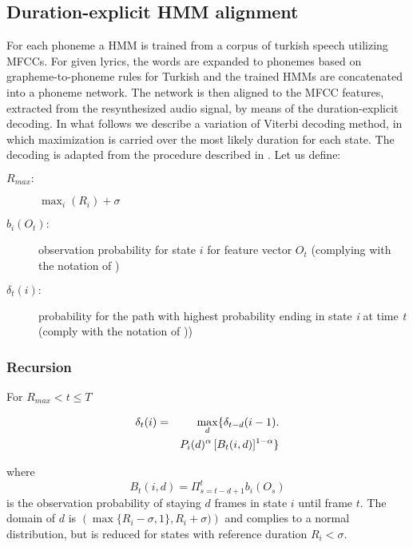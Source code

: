 \documentclass{article}
\begin{document}
\subsection{Duration-explicit HMM alignment}

For each phoneme a HMM is trained from a corpus of turkish speech
utilizing MFCCs. For given lyrics, the words are expanded to phonemes
based on grapheme-to-phoneme rules for Turkish \cite[Table 1]{Salor2007580}
and the trained HMMs are concatenated into a phoneme network.
The network is then aligned to the MFCC features, extracted from the
resynthesized audio signal, by means of the duration-explicit decoding.
In what follows we describe a variation of Viterbi decoding method,
in which maximization is carried over the most likely duration for
each state. The decoding is adapted from the procedure described in
\cite{chen2012chord}. Let us define: 
\begin{description}
\item [{$R_{max}:$}] $\max_{i}(R_{i})+\sigma$
\item [{$b_{i}(O_{t}):$}] observation probability for state $i$ for feature
vector $O_{t}$ (complying with the notation of \cite{rabiner1989tutorial})\textcolor{red}{} 
\item [{$\delta_{t}(i):$}] probability for the path with highest probability
ending in state \emph{i} at time \emph{t} (comply with the notation
of \cite[III. B]{rabiner1989tutorial}))
\end{description}





\subsubsection{Recursion}

For $R_{max}<t\leq T$

\begin{eqnarray}
\delta_{t}(i) & = & \max_{d}\{\delta_{t-d}(i-1).\nonumber \\
 &  & P_{i}(d)^{\alpha}\thinspace[B_{t}(i,d)]^{1-\alpha}\}\label{eq:decoding}
\end{eqnarray}


where 
\begin{equation}
B_{t}(i,d)=\Pi_{s=t-d+1}^{t}b_{i}(O_{s})
\end{equation}
 is the observation probability of staying $d$ frames in state $i$
until frame $t$. The domain of $d$ is $\left(\max\{R_{i}-\sigma,1\},R_{i}+\sigma)\right)$ and complies to a normal distribution, but is reduced for states
with reference duration $R_{i}<\sigma$. %
\end{document}
